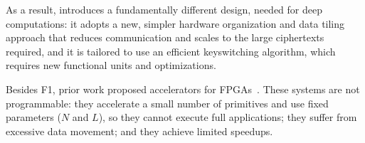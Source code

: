 As a result, \name introduces a fundamentally different design, needed for deep computations:
it adopts a new, simpler hardware organization and data tiling approach
that reduces communication and scales to the large ciphertexts required,
and it is tailored to use an efficient keyswitching algorithm,
which requires new functional units and optimizations.


Besides F1, prior work proposed accelerators for FPGAs~\cite{cousins:hpec14:fpga-he,cousins:tetc17:fpga-he,doroz:tc15:accelerating-fhe,roy:hpca19:fpga-he,migliore:tecs17:he-karatsuba,riazi:asplos20:heax,turan:tc20:heaws,mert:tvlsi20:bfv-accel}.
These systems are not programmable: they accelerate a small number of primitives and use fixed parameters ($N$ and $L$),
so they cannot execute full applications; they suffer from excessive data movement;
and they achieve limited speedups.

